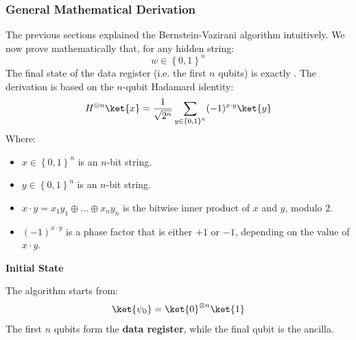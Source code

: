 \subsubsection{General Mathematical Derivation}\label{sec:bernstein-vazirani-general-mathematical-derivation}

The previous sections explained the Bernstein-Vazirani algorithm intuitively. We now prove mathematically that, for any hidden string:
\begin{equation*}
    w \in \left\{0,1\right\}^n
\end{equation*}
The final state of the data register (i.e. the first $n$ qubits) is exactly . The derivation is based on the $n$-qubit Hadamard identity:
\begin{equation}
    H^{\otimes n} \ket{x} = \frac{1}{\sqrt{2^n}} \sum_{y \in \left\{0,1\right\}^n} (-1)^{x \cdot y} \ket{y}
\end{equation}
Where:
\begin{itemize}
    \item $x \in \left\{0,1\right\}^n$ is an $n$-bit string.
    \item $y \in \left\{0,1\right\}^n$ is an $n$-bit string.
    \item $x \cdot y = x_1 y_1 \oplus \dots \oplus x_n y_n$ is the bitwise inner product of $x$ and $y$, modulo 2.
    \item $(-1)^{x \cdot y}$ is a phase factor that is either $+1$ or $-1$, depending on the value of $x \cdot y$.
\end{itemize}

\highspace
\begin{flushleft}
    \textcolor{Green3}{ \textbf{Initial State}}
\end{flushleft}
The algorithm starts from:
\begin{equation}
    \ket{\psi_0} = \ket{0}^{\otimes n} \ket{1}
\end{equation}
The first $n$ qubits form the \textbf{data register}, while the final qubit is the ancilla.

